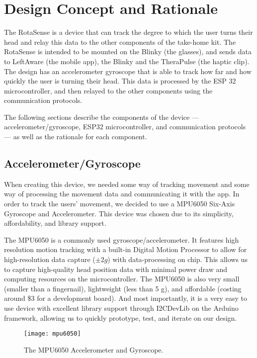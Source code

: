 \chapter{Design Concept and Rationale}
\label{chap:design}

The RotaSense is a device that can track the degree to which the user turns
their head and relay this data to the other components of the take-home kit. The
RotaSense is intended to be mounted on the Blinky (the glasses), and sends data
to LeftAware (the mobile app), the Blinky and the TheraPulse (the haptic
clip). The design has an accelerometer gyroscope that is able to track how far
and how quickly the user is turning their head. This data is processed by the
ESP 32 microcontroller, and then relayed to the other components using the
communication protocols.

The following sections describe the components of the
device --- accelerometer/gyroscope, ESP32 microcontroller, and communication
protocols --- as well as the rationale for each component.

\section{Accelerometer/Gyroscope}\label{sec:mpu6050}

When creating this device, we needed some way of tracking movement and some way
of processing the movement data and communicating it with the app. In order to
track the users’ movement, we decided to use a MPU6050 Six-Axis Gyroscope and
Accelerometer. This device was chosen due to its simplicity, affordability, and
library support.

The MPU6050 is a commonly used gyroscope/accelerometer. It features high
resolution motion tracking with a built-in Digital Motion Processor to allow for
high-resolution data capture ($\pm 2g$) with data-processing on chip. This
allows us to capture high-quality head position data with minimal power draw and
computing resources on the microcontroller. The MPU6050 is also very small
(smaller than a fingernail), lightweight (less than 5 g), and affordable
(costing around \$3 for a development board). And most importantly, it is a very
easy to use device with excellent library support through I2CDevLib on the
Arduino framework, allowing us to quickly prototype, test, and iterate on our
design.

\begin{figure}[h]
  \centering
  \texttt{[image: mpu6050]}
  \caption{The MPU6050 Accelerometer and Gyroscope.}
\end{figure}

